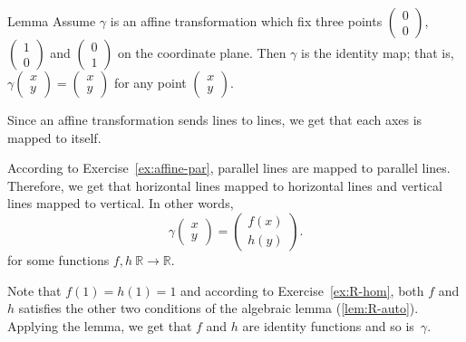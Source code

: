 \begin{thm}{Lemma}\label{lem:3-fix}
Assume $\gamma$ is an affine transformation which fix three points $\left(\begin{smallmatrix}
0\\ 0
\end{smallmatrix} \right)$, 
$\left(\begin{smallmatrix}
1\\ 0
\end{smallmatrix} \right)$ 
and $\left(\begin{smallmatrix}
0\\ 1
\end{smallmatrix} \right)$ on the coordinate plane.
Then $\gamma$ is the identity map; 
that is, $\gamma\left(\begin{smallmatrix}
x\\ y
\end{smallmatrix} \right)
=
\left(\begin{smallmatrix}
x\\ y
\end{smallmatrix} \right)$ for any point $\left(\begin{smallmatrix}
x\\ y
\end{smallmatrix} \right)$.
\end{thm}

Since an affine transformation sends lines to lines, we get that each axes is mapped to itself.

According to Exercise~\ref{ex:affine-par}, 
parallel lines are mapped to parallel lines.
Therefore, we get that horizontal lines mapped to horizontal lines 
and
vertical lines mapped to vertical.
In other words,
\[\gamma\left(\begin{smallmatrix}
x\\ y
\end{smallmatrix} \right)
=
\left(\begin{smallmatrix}
f(x)\\ h(y)
\end{smallmatrix} \right).\]
for some functions $f,h\:\mathbb{R}\to\mathbb{R}$.

Note that $f(1)=h(1)=1$ and according to 
Exercise~\ref{ex:R-hom}, 
both $f$ and $h$ satisfies the other two conditions of the algebraic lemma (\ref{lem:R-auto}).
Applying the lemma, we get that $f$ and $h$ 
are identity functions
and so is~$\gamma$.
\qeds

